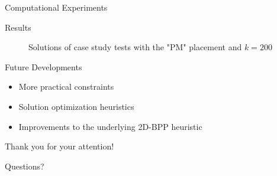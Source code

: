 \documentclass{beamer}
\begin{document}
    \begin{frame}{Computational Experiments}
        
    \end{frame}

    \begin{frame}{Results}
        \begin{figure}
            \centering
            \caption{Solutions of case study tests with the "PM" placement and $k=200$}
            \label{fig:usecase_tests}
        \end{figure}
    \end{frame}

    \begin{frame}{Future Developments}
        \begin{itemize}
            \item More practical constraints
            \item Solution optimization heuristics
            \item Improvements to the underlying 2D-BPP heuristic
        \end{itemize}
    \end{frame}

    \begin{frame}{}
        Thank you for your attention!

        Questions?
    \end{frame}
\end{document}
